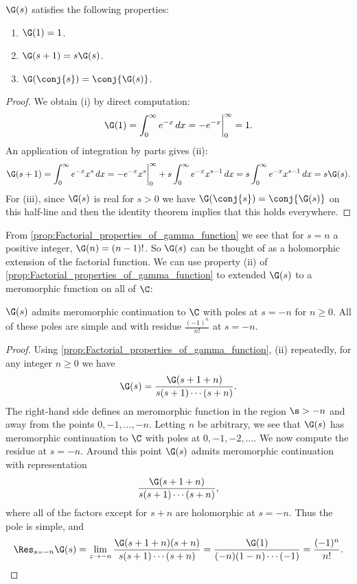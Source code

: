     \begin{proposition}\label{prop:Factorial_properties_of_gamma_function}
      $\G(s)$ satisfies the following properties:
      \begin{enumerate}[label=(\roman*)]
        \item $\G(1) = 1$.
        \item $\G(s+1) = s\G(s)$.
        \item $\G(\conj{s}) = \conj{\G(s)}$.
      \end{enumerate}
    \end{proposition}
    \begin{proof}
      We obtain (i) by direct computation:
      \[
        \G(1) = \int_{0}^{\infty}e^{-x}\,dx = -e^{-x}\bigg|_{0}^{\infty} = 1.
      \]
      An application of integration by parts gives (ii):
      \[
        \G(s+1) = \int_{0}^{\infty}e^{-x}x^{s}\,dx = -e^{-x}x^{s}\bigg|_{0}^{\infty}+s\int_{0}^{\infty}e^{-x}x^{s-1}\,dx = s\int_{0}^{\infty}e^{-x}x^{s-1}\,dx = s\G(s).
      \]
      For (iii), since $\G(s)$ is real for $s >0$ we have $\G(\conj{s}) = \conj{\G(s)}$ on this half-line and then the identity theorem implies that this holds everywhere.
    \end{proof}

    From \cref{prop:Factorial_properties_of_gamma_function} we see that for $s = n$ a positive integer, $\G(n) = (n-1)!$. So $\G(s)$ can be thought of as a holomorphic extension of the factorial function. We can use property (ii) of \cref{prop:Factorial_properties_of_gamma_function} to extended $\G(s)$ to a meromorphic function on all of $\C$:

    \begin{theorem}\label{thm:continuation_of_gamma_function}
      $\G(s)$ admits meromorphic continuation to $\C$ with poles at $s = -n$ for $n \ge 0$. All of these poles are simple and with residue $\frac{(-1)^{n}}{n!}$ at $s = -n$.
    \end{theorem}
    \begin{proof}
      Using \cref{prop:Factorial_properties_of_gamma_function}, (ii) repeatedly, for any integer $n \ge 0$ we have
      \[
        \G(s) = \frac{\G(s+1+n)}{s(s+1) \cdots (s+n)}.
      \]
      The right-hand side defines an meromorphic function in the region $\s > -n$ and away from the points $0,-1,\ldots,-n$. Letting $n$ be arbitrary, we see that $\G(s)$ has meromorphic continuation to $\C$ with poles at $0,-1,-2,\ldots$. We now compute the residue at $s = -n$. Around this point $\G(s)$ admits meromorphic continuation with representation
      \[
        \frac{\G(s+1+n)}{s(s+1) \cdots (s+n)},
      \]
      where all of the factors except for $s+n$ are holomorphic at $s = -n$. Thus the pole is simple, and
      \[
        \Res_{s = -n}\G(s) = \lim_{z \to -n}\frac{\G(s+1+n)(s+n)}{s(s+1) \cdots (s+n)} = \frac{\G(1)}{(-n)(1-n) \cdots (-1)} = \frac{(-1)^{n}}{n!}.
      \]
    \end{proof}

